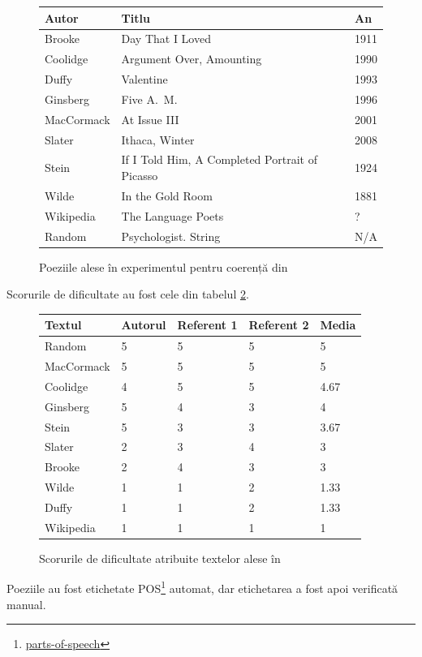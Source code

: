\begin{figure}[!htb]
  \centering
  \begin{tabular}{l|l|l}
    Autor & Titlu & An \\
    \hline
    Brooke & Day That I Loved & 1911 \\
    Coolidge & Argument Over, Amounting & 1990 \\
    Duffy & Valentine & 1993 \\
    Ginsberg & Five A.\ M.\ & 1996 \\
    MacCormack & At Issue III & 2001 \\
    Slater & Ithaca, Winter & 2008 \\
    Stein & If I Told Him, \newline A Completed Portrait of Picasso & 1924 \\
    Wilde & In the Gold Room & 1881 \\
    Wikipedia & The Language Poets & ? \\
    Random & Psychologist. String & N/A
  \end{tabular}
  \caption{Poeziile alese în experimentul pentru coerență din \cite{herbelot}}
  \label{fig:tab-poezii}
\end{figure}

Scorurile de dificultate au fost cele din tabelul \ref{fig:dif}.

\begin{figure}[!htb]
  \centering
  \begin{tabular}{l|l|l|l|l}
    Textul & Autorul & Referent 1 & Referent 2 & Media \\
    \hline
    Random & 5 & 5 & 5 & 5 \\
    MacCormack & 5 & 5 & 5 & 5 \\
    Coolidge & 4 & 5 & 5 & 4.67 \\
    Ginsberg & 5 & 4 & 3 & 4 \\
    Stein & 5 & 3 & 3 & 3.67 \\
    Slater & 2 & 3 & 4 & 3 \\
    Brooke & 2 & 4 & 3 & 3 \\
    Wilde & 1 & 1 & 2 & 1.33 \\
    Duffy & 1 & 1 & 2 & 1.33 \\
    Wikipedia & 1 & 1 & 1 & 1
  \end{tabular}
  \caption{Scorurile de dificultate atribuite textelor alese în \cite{herbelot}}
  \label{fig:dif}
\end{figure}

Poeziile au fost etichetate POS\footnote{\href{https://en.wikipedia.org/wiki/Part-of-speech\_tagging}{parts-of-speech}}
automat, dar etichetarea a fost apoi verificată manual.

